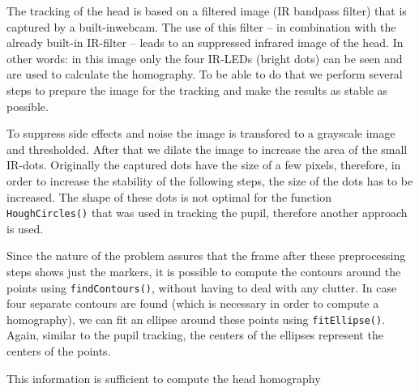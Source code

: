 The tracking of the head is based on a filtered image (IR bandpass filter) that is captured by a built-inwebcam. The use of this filter -- in combination with the already built-in IR-filter -- leads to an suppressed infrared image of the head.
In other words: in this image only the four IR-LEDs (bright dots) can be seen and are used to calculate the homography. 
To be able to do that we perform several steps to prepare the image for the tracking and make the results as stable as possible.

To suppress side effects and noise the image is transfored to a grayscale image and thresholded. 
After that we dilate the image to increase the area of the small IR-dots. Originally the captured dots have the size of a few pixels, therefore, in order to increase the stability of the following steps, the size of the dots has to be increased. 
The shape of these dots is not optimal for the function \texttt{HoughCircles()} that was used in tracking the pupil, therefore another approach is used. 

Since the nature of the problem assures that the frame after these preprocessing steps shows just the markers, it is possible to compute the contours around the points using \texttt{findContours()}, without having to deal with any clutter. 
In case four separate contours are found (which is necessary in order to compute a homography), we can fit an ellipse around these points using \texttt{fitEllipse()}. Again, similar to the pupil tracking, the centers of the ellipses represent the centers of the points.

This information is sufficient to compute the head homography
 
